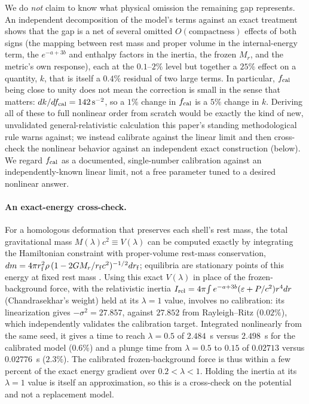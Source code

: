 \documentclass[11pt]{article}
\begin{document}
We do \emph{not} claim to know what physical omission the remaining gap represents. An independent decomposition of the model's terms against an exact treatment shows that the gap is a net of several omitted $O(\text{compactness})$ effects of both signs (the mapping between rest mass and proper volume in the internal-energy term, the $e^{-a+3b}$ and enthalpy factors in the inertia, the frozen $M_r$, and the metric's own response), each at the $0.1$--$2\%$ level but together a $25\%$ effect on a quantity, $k$, that is itself a $0.4\%$ residual of two large terms. In particular, $f_{\rm cal}$ being close to unity does not mean the correction is small in the sense that matters: $dk/df_{\rm cal}=142\,{\rm s}^{-2}$, so a $1\%$ change in $f_{\rm cal}$ is a $5\%$ change in $k$. Deriving all of these to full nonlinear order from scratch would be exactly the kind of new, unvalidated general-relativistic calculation this paper's standing methodological rule warns against; we instead calibrate against the linear limit and then cross-check the nonlinear behavior against an independent exact construction (below). We regard $f_{\rm cal}$ as a documented, single-number calibration against an independently-known linear limit, not a free parameter tuned to a desired nonlinear answer.

\paragraph{An exact-energy cross-check.} For a homologous deformation that preserves each shell's rest mass, the total gravitational mass $M(\lambda)c^2\equiv V(\lambda)$ can be computed exactly by integrating the Hamiltonian constraint with proper-volume rest-mass conservation, $dm=4\pi r_{\rm f}^2\rho\,\allowbreak(1-2GM_r/r_{\rm f}c^2)^{-1/2}\allowbreak dr_{\rm f}$; equilibria are stationary points of this energy at fixed rest mass \citep{HTWW1965}. Using this exact $V(\lambda)$ in place of the frozen-background force, with the relativistic inertia $I_{\rm rel}=4\pi\!\int e^{-a+3b}(\varepsilon+P/c^2)r^4dr$ (Chandrasekhar's weight) held at its $\lambda=1$ value, involves no calibration: its linearization gives $-\sigma^2=27.857$, against $27.852$ from Rayleigh--Ritz ($0.02\%$), which independently validates the calibration target. Integrated nonlinearly from the same seed, it gives a time to reach $\lambda=0.5$ of $2.484$~s versus $2.498$~s for the calibrated model ($0.6\%$) and a plunge time from $\lambda=0.5$ to $0.15$ of $0.02713$ versus $0.02776$~s ($2.3\%$). The calibrated frozen-background force is thus within a few percent of the exact energy gradient over $0.2<\lambda<1$. Holding the inertia at its $\lambda=1$ value is itself an approximation, so this is a cross-check on the potential and not a replacement model.
\end{document}
